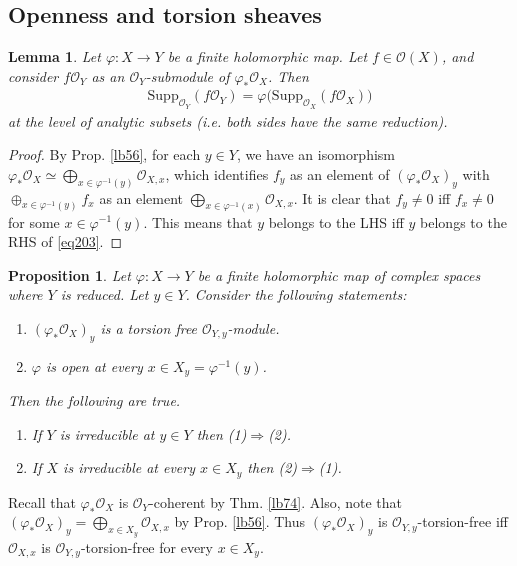 \documentclass[12pt,b5paper,notitlepage]{report}
\theoremstyle{definition}
\theoremstyle{plain}
\newtheorem{pp}[df]{Proposition}
\newtheorem{lm}[df]{Lemma}
\newcommand{\scr}{\mathscr}
\newcommand{\Supp}{\mathrm{Supp}}
\numberwithin{equation}{section}
\begin{document}
\subsection{Openness and torsion sheaves}


\begin{lm}\label{lb393}
Let $\varphi:X\rightarrow Y$ be a finite holomorphic map. Let $f\in\scr O(X)$, and consider $f\scr O_Y$ as an $\scr O_Y$-submodule of $\varphi_*\scr O_X$. Then
\begin{align}
\Supp_{\scr O_Y}(f\scr O_Y)=\varphi\big(\Supp_{\scr O_X}(f\scr O_X)\big)  \label{eq203}
\end{align}
at the level of analytic subsets (i.e. both sides have the same reduction).
\end{lm}

\begin{proof}
By Prop. \ref{lb56}, for each $y\in Y$,  we have an isomorphism $\varphi_*\scr O_X\simeq\bigoplus_{x\in\varphi^{-1}(y)}\scr O_{X,x}$, which identifies $f_y$ as an element of $(\varphi_*\scr O_X)_y$ with $\oplus_{x\in\varphi^{-1}(y)}f_x$ as an element $\bigoplus_{x\in\varphi^{-1}(x)}\scr O_{X,x}$. It is clear that $f_y\neq 0$ iff $f_x\neq 0$ for some $x\in\varphi^{-1}(y)$. This means that $y$ belongs to the LHS iff $y$ belongs to the RHS of \eqref{eq203}. 
\end{proof}



\begin{pp}\label{lb169}
Let $\varphi:X\rightarrow Y$ be a finite holomorphic map of complex spaces where $Y$ is reduced. Let $y\in Y$. Consider the following statements:
\begin{enumerate}[label=(\arabic*)]
\item $(\varphi_*\scr O_X)_y$ is a torsion free $\scr O_{Y,y}$-module.
\item $\varphi$ is open at every $x\in X_y=\varphi^{-1}(y)$. 
\end{enumerate}
Then the following are true.
\begin{enumerate}[label=\boxed{\Alph*}]
\item If $Y$ is irreducible at $y\in Y$ then (1)$\Rightarrow$(2).
\item If $X$ is irreducible at every $x\in X_y$ then (2)$\Rightarrow$(1).
\end{enumerate}
\end{pp}




Recall that $\varphi_*\scr O_X$ is $\scr O_Y$-coherent by Thm. \ref{lb74}. Also, note that $(\varphi_*\scr O_X)_y=\bigoplus_{x\in X_y}\scr O_{X,x}$ by Prop. \ref{lb56}. Thus $(\varphi_*\scr O_X)_y$ is $\scr O_{Y,y}$-torsion-free iff $\scr O_{X,x}$ is $\scr O_{Y,y}$-torsion-free for every $x\in X_y$.
\end{document}
